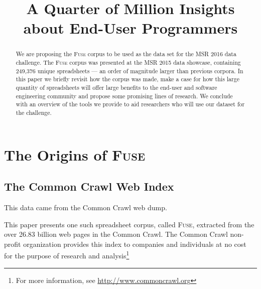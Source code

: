 \documentclass[conference]{IEEEtran}
\newcommand{\xlscount}{249,376}
\begin{document}
\title{A Quarter of Million Insights about End-User Programmers}

\author{
}


\maketitle

\begin{abstract}
We are proposing the \textsc{Fuse} corpus to be used as the data set for the MSR 2016 data challenge.
The \textsc{Fuse} corpus was presented at the MSR 2015 data showcase, containing \xlscount{} unique spreadsheets --- an order of magnitude larger than previous corpora.
In this paper we briefly revisit how the corpus was made, make a case for how this large quantity of spreadsheets will offer large benefits to the end-user and software engineering community and propose some promising lines of research.
We conclude with an overview of the tools we provide to aid researchers who will use our dataset for the challenge.

\end{abstract}


\IEEEpeerreviewmaketitle

\section{The Origins of \textsc{Fuse}}

\subsection{The Common Crawl Web Index}

This data came from the Common Crawl web dump.

This paper presents one such spreadsheet corpus, called \textsc{Fuse}, extracted from the over 26.83 billion web pages in the Common Crawl. 
The Common Crawl non-profit organization provides this index to companies and individuals at no cost for the purpose of research and analysis\footnote{For more information, see \url{http://www.commoncrawl.org}}
\end{document}
